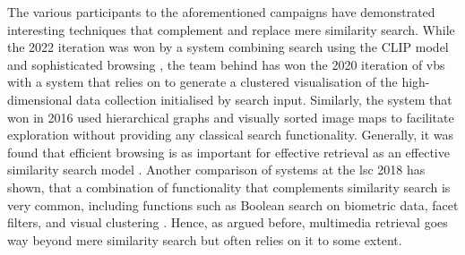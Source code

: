 The various participants to the aforementioned campaigns have demonstrated interesting techniques that complement and replace mere similarity search. While the 2022 iteration was won by a system combining search using the CLIP model \cite{Radford:2021Learning} and sophisticated browsing \cite{Hezel:2022Efficient}, the team behind \cite{Kratochvil:2020SOM} has won the 2020 iteration of \acrshort{vbs} with a system that relies on  \cite{Kohonen:1990Self} to generate a clustered visualisation of the high-dimensional data collection initialised by search input. Similarly, the system that won in 2016 used \cite{Barthel:2016Navigating} hierarchical graphs and visually sorted image maps to facilitate exploration without providing any classical search functionality. Generally, it was found that efficient browsing is as important for effective retrieval as an effective similarity search model \cite{Lokovc:2019Interactive}. Another comparison of systems at the \acrshort{lsc} 2018 has shown, that a combination of functionality that complements similarity search is very common, including functions such as Boolean search on biometric data, facet filters, and visual clustering \cite{Gurrin:2019Invited}. Hence, as argued before, multimedia retrieval goes way beyond mere similarity search but often relies on it to some extent.